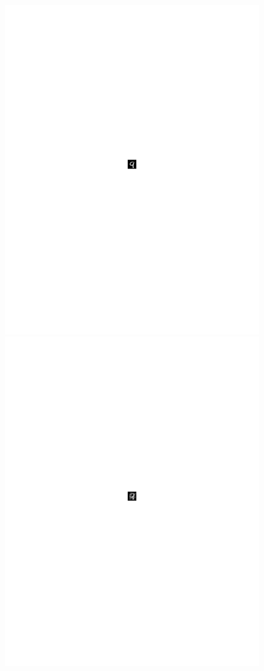 \begin{figure}
\centering
\begin{minipage}{.09\textwidth}
	\centering
    \includegraphics[width =0.9\linewidth, trim = 300 400 300 375, clip]{figs/orig9.pdf}
\end{minipage}%
\begin{minipage}{.09\textwidth}
	\centering
\includegraphics[width =0.9\linewidth, trim = 300 400 300 375, clip]{figs/goodfellow9.pdf}

\end{minipage}
\end{figure}
